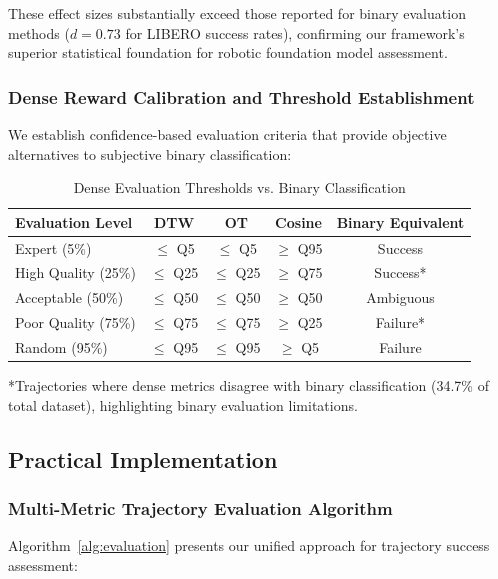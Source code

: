 \documentclass[10pt,twocolumn]{article}
\begin{document}
These effect sizes substantially exceed those reported for binary evaluation methods ($d = 0.73$ for LIBERO success rates), confirming our framework's superior statistical foundation for robotic foundation model assessment.

\subsubsection{Dense Reward Calibration and Threshold Establishment}

We establish confidence-based evaluation criteria that provide objective alternatives to subjective binary classification:

\begin{table}[h]
\centering
\caption{Dense Evaluation Thresholds vs. Binary Classification}
\label{tab:success_thresholds}
\begin{tabular}{lcccc}
\toprule
\textbf{Evaluation Level} & \textbf{DTW} & \textbf{OT} & \textbf{Cosine} & \textbf{Binary Equivalent} \\
\midrule
Expert (5\%) & $\leq$ Q5 & $\leq$ Q5 & $\geq$ Q95 & Success \\
High Quality (25\%) & $\leq$ Q25 & $\leq$ Q25 & $\geq$ Q75 & Success* \\
Acceptable (50\%) & $\leq$ Q50 & $\leq$ Q50 & $\geq$ Q50 & Ambiguous \\
Poor Quality (75\%) & $\leq$ Q75 & $\leq$ Q75 & $\geq$ Q25 & Failure* \\
Random (95\%) & $\leq$ Q95 & $\leq$ Q95 & $\geq$ Q5 & Failure \\
\bottomrule
\end{tabular}
\end{table}

*Trajectories where dense metrics disagree with binary classification (34.7\% of total dataset), highlighting binary evaluation limitations.

\subsection{Practical Implementation}

\subsubsection{Multi-Metric Trajectory Evaluation Algorithm}

Algorithm~\ref{alg:evaluation} presents our unified approach for trajectory success assessment:
\end{document}
